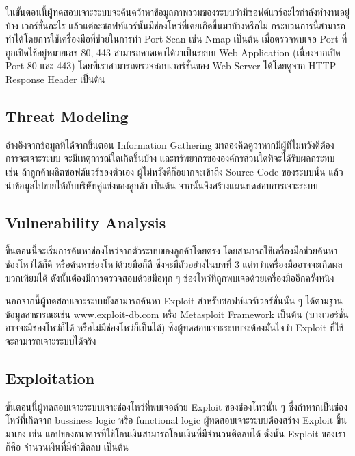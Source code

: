 ในขั้นตอนนี้ผู้ทดสอบเจาะระบบจะค้นคว้าหาข้อมูลภาพรวมของระบบว่ามีซอฟต์แวร์อะไรกำลังทำงานอยู่บ้าง เวอร์ชั่นอะไร แล้วแต่ละซอฟท์แวร์นั้นมีช่องโหว่ที่เคยเกิดขึ้นมาบ้างหรือไม่ กระบวนการนี้สามารถทำได้โดยการใช้เครื่องมือที่ช่วยในการทำ Port Scan\cite{???} เช่น Nmap\cite{???} เป็นต้น เมื่อตรวจพบเจอ Port\cite{???}  ที่ถูกเปิดใช้อยู่หมายเลข 80, 443 สามารถคาดเดาได้ว่าเป็นระบบ Web Application (เนื่องจากเปิด Port 80 และ 443) โดยที่เราสามารถตรวจสอบเวอร์ชั่นของ Web Server ได้โดยดูจาก HTTP Response Header เป็นต้น

\subsection{Threat Modeling}

อ้างอิงจากข้อมูลที่ได้จากขึ้นตอน Information Gathering มาลองคิดดูว่าหากมีผู้ทีไม่หวังดีต้อง
การจะเจาะระบบ จะมีเหตุการณ์ใดเกิดขึ้นบ้าง และทรัพยากรขององค์กรส่วนใดที่จะได้รับผลกระทบ เช่น ถ้าลูกค้าผลิตซอฟต์แวร์ของตัวเอง ผู้ไม่หวังดีก็อยากจะเข้าถึง Source Code ของระบบนั้น แล้วนำข้อมูลไปขายให้กับบริษัทคู่แข่งของลูกค้า เป็นต้น จากนั้นจึงสร้างแผนทดสอบการเจาะระบบ

\subsection{Vulnerability Analysis}

ขึ้นตอนนี้จะเริ่มการค้นหาช่องโหว่จากตัวระบบของลูกค้าโดยตรง โดยสามารถใช้เครื่องมือช่วยค้นหาช่องโหว่ได้ก็ดี หรือค้นหาช่องโหว่ด้วยมือก็ดี ซึ่งจะมีตัวอย่างในบทที่ 3 แต่ทว่าเครื่องมืออาจจะเกิดผลบวกเทียมได้ ดังนั้นต้องมีการตรวจสอบด้วยมือทุก ๆ ช่องโหว่ที่ถูกพบเจอด้วยเครื่องมืออีกครั้งหนึ่ง

นอกจากนี้ผู้ทดสอบเจาะระบบยังสามารถค้นหา Exploit สำหรับซอฟท์แวร์เวอร์ชั่นนั้น ๆ ได้ตามฐานข้อมูลสาธารณะเช่น www.exploit-db.com\cite{???}  หรือ Metasploit Framework\cite{???} เป็นต้น (บางเวอร์ชั่นอาจจะมีช่องโหว่ก็ได้ หรือไม่มีช่องโหว่ก็เป็นได้) ซึ่งผู้ทดสอบเจาะระบบจะต้องมั่นใจว่า Exploit ที่ใช้จะสามารถเจาะระบบได้จริง

\subsection{Exploitation}

ขั้นตอนนี้ผู้ทดสอบเจาะระบบเจาะช่องโหว่ที่พบเจอด้วย Exploit ของช่องโหว่นั้น ๆ ซึ่งถ้าหากเป็นช่องโหว่ที่เกิดจาก bussiness logic หรือ functional logic ผู้ทดสอบเจาะระบบต้องสร้าง Exploit ขึ้นมาเอง เช่น แอปของธนาคารที่ใช้โอนเงินสามารถโอนเงินที่มีจำนวนติดลบได้ ดั้งนั้น Exploit ของเราก็คือ จำนวนเงินที่มีค่าติดลบ เป็นต้น 

